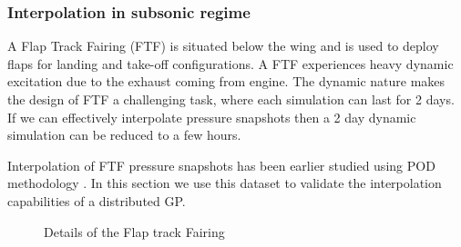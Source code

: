\subsubsection{Interpolation in subsonic regime}\label{subSec:elsAResults}
A Flap Track Fairing (FTF) is situated below the wing and is used to deploy flaps for landing and take-off configurations. A FTF experiences heavy dynamic excitation due to the exhaust coming from engine. The dynamic nature makes the design of FTF a challenging task, where each simulation can last for 2 days. If we can effectively interpolate pressure snapshots then a 2 day dynamic simulation can be reduced to a few hours. 

Interpolation of FTF pressure snapshots has been earlier studied using POD methodology \cite{bosco2016nonlinear}. In this section we use this dataset to validate the interpolation capabilities of a distributed GP. 


\begin{figure}[!ht]
  \centering
  \quad
  \quad
      \caption{Details of the Flap track Fairing}
\end{figure}



